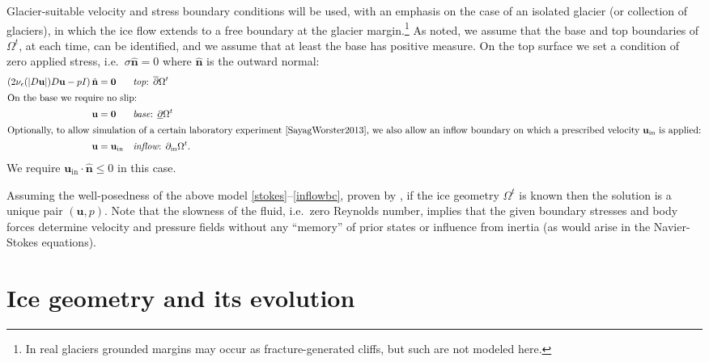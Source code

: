 \documentclass[letterpaper,final,12pt,reqno]{amsart}
\newcommand{\eps}{\epsilon}
\newcommand{\hbn}{\hat{\mathbf{n}}}
\newcommand{\bu}{\mathbf{u}}
\newcommand{\bzero}{\bm{0}}
\begin{document}
Glacier-suitable velocity and stress boundary conditions will be used, with an emphasis on the case of an isolated glacier (or collection of glaciers), in which the ice flow extends to a free boundary at the glacier margin.\footnote{In real glaciers grounded margins may occur as fracture-generated cliffs, but such are not modeled here.}  As noted, we assume that the base and top boundaries of $\Omega^t$, at each time, can be identified, and we assume that at least the base has positive measure.  On the top surface we set a condition of zero applied stress, i.e.~$\sigma\hbn=0$ where $\hbn$ is the outward normal:
\begin{align}
\left(2 \nu_\eps(|D\bu|) D\bu - pI\right) \hbn &= \bzero  &&\text{\emph{top}: } \overline{\partial} \Omega^t \label{topbc} \\
\intertext{On the base we require no slip:}
\bu &= \bzero  &&\text{\emph{base}: } \underline{\partial} \Omega^t \label{basebc} \\
\intertext{Optionally, to allow simulation of a certain laboratory experiment \cite{SayagWorster2013}, we also allow an inflow boundary on which a prescribed velocity $\bu_{\text{in}}$ is applied:}
\bu &= \bu_{\text{in}}  &&\text{\emph{inflow}: } \partial_{\text{in}} \Omega^t. \label{inflowbc}
\end{align}
We require $\bu_{\text{in}}\cdot \hbn \le 0$ in this case.

Assuming the well-posedness of the above model \eqref{stokes}--\eqref{inflowbc}, proven by \cite{JouvetRappaz2011}, if the ice geometry $\Omega^t$ is known then the solution is a unique pair $(\bu,p)$.  Note that the slowness of the fluid, i.e.~zero Reynolds number, implies that the given boundary stresses and body forces determine velocity and pressure fields without any ``memory'' of prior states or influence from inertia (as would arise in the Navier-Stokes equations).


\section{Ice geometry and its evolution} \label{sec:stronggeometry}
\end{document}
